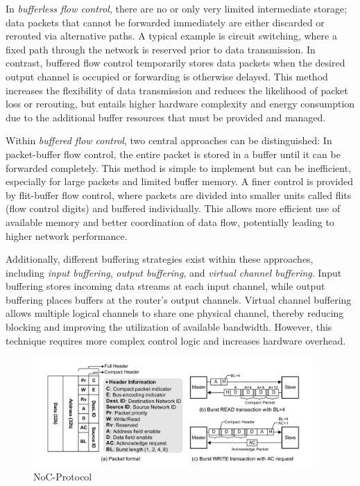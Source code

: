 In \textit{bufferless flow control}, there are no or only very limited intermediate storage; data packets that cannot be forwarded immediately are either discarded or rerouted via alternative paths. A typical example is circuit switching, where a fixed path through the network is reserved prior to data transmission. In contrast, buffered flow control temporarily stores data packets when the desired output channel is occupied or forwarding is otherwise delayed. This method increases the flexibility of data transmission and reduces the likelihood of packet loss or rerouting, but entails higher hardware complexity and energy consumption due to the additional buffer resources that must be provided and managed. 

Within \textit{buffered flow control}, two central approaches can be distinguished: In packet-buffer flow control, the entire packet is stored in a buffer until it can be forwarded completely. This method is simple to implement but can be inefficient, especially for large packets and limited buffer memory. A finer control is provided by flit-buffer flow control, where packets are divided into smaller units called flits (flow control digits) and buffered individually. This allows more efficient use of available memory and better coordination of data flow, potentially leading to higher network performance. 

Additionally, different buffering strategies exist within these approaches, including \textit{input buffering}, \textit{output buffering}, and \textit{virtual channel buffering}. Input buffering stores incoming data streams at each input channel, while output buffering places buffers at the router’s output channels. Virtual channel buffering allows multiple logical channels to share one physical channel, thereby reducing blocking and improving the utilization of available bandwidth. However, this technique requires more complex control logic and increases hardware overhead.\cite{dally_principles_2004}
\fi

\iffalse
{}
\begin{figure}[htbp]
    \centering
    \includegraphics[width=0.95\textwidth]{img/NoC Protocol.png}
    \caption{NoC-Protocol~\cite{lee_low-power_2006}}\label{fig:NOC_Protocol}
\end{figure}

